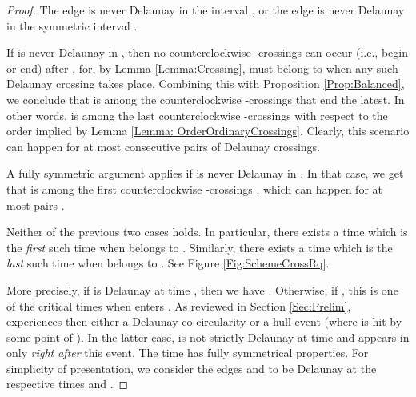 \documentclass[letter,11pt]{article}
\begin{document}
\begin{proof}
\smallskip
{} The edge  is never Delaunay in the interval , or the edge  is never Delaunay in the symmetric interval .

If  is never Delaunay in , then no counterclockwise -crossings  can occur (i.e., begin or end) after , for, by Lemma \ref{Lemma:Crossing},  must belong to  when any such Delaunay crossing takes place. 
Combining this with Proposition \ref{Prop:Balanced}, we conclude that  is among the  counterclockwise -crossings  that end the latest. In other words,  is among the last  counterclockwise -crossings with respect to the order implied by Lemma \ref{Lemma: OrderOrdinaryCrossings}. Clearly, this scenario can happen for at most  consecutive pairs  of Delaunay crossings. 

A fully symmetric argument applies if  is never Delaunay in .
In that case, we get that  is among the first  counterclockwise -crossings , which can happen for at most  pairs .

\medskip
{} Neither of the previous two cases holds. 
In particular, there exists a time  which is the {\it first} such time when  belongs to .
Similarly, there exists a time  which is the {\it last} such time when  belongs to . See Figure \ref{Fig:SchemeCrossRq}.

More precisely, if  is Delaunay at time , then we have . Otherwise, if , this is one of the critical times when  enters . As reviewed in Section \ref{Sec:Prelim},  experiences then either a Delaunay co-circularity or a hull event (where  is hit by some point of ). In the latter case,  is not strictly Delaunay at time  and appears in  only {\it right after} this event. The time  has fully symmetrical properties. For simplicity of presentation, we consider the edges  and  to be Delaunay at the respective times  and .


\end{proof}
\end{document}
